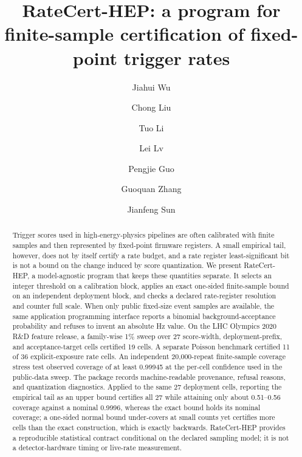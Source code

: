 \documentclass[preprint,12pt]{elsarticle}
\begin{document}
\begin{frontmatter}

\title{RateCert-HEP: a program for finite-sample certification of
fixed-point trigger rates}

\author[hebut]{Jiahui Wu}
\author[hongyang]{Chong Liu}
\author[hongyang]{Tuo Li}
\author[hongyang]{Lei Lv}
\author[hongyang]{Pengjie Guo}
\author[hongyang]{Guoquan Zhang}
\author[hebut]{Jianfeng Sun}

\address[hebut]{School of Materials Science and Engineering, Hebei University of
Technology, Tianjin 300401, China}
\address[hongyang]{Hongyang Display (Xianyang) Technology Co., Ltd.,
Xianyang 712000, Shaanxi, China}

\begin{abstract}
Trigger scores used in high-energy-physics pipelines are often calibrated with
finite samples and then represented by fixed-point firmware registers.  A small
empirical tail, however, does not by itself certify a rate budget, and a rate
register least-significant bit is not a bound on the change induced by score
quantization.  We present RateCert-HEP, a model-agnostic program that keeps
these quantities separate.  It selects an integer threshold on a calibration
block, applies an exact one-sided finite-sample bound on an independent
deployment block, and checks a declared rate-register resolution and counter
full scale.  When only public fixed-size event samples are available, the same
application programming interface reports a binomial background-acceptance
probability and refuses to invent an absolute Hz value.  On the LHC Olympics
2020 R\&D feature release, a family-wise 1\% sweep over 27 score-width,
deployment-prefix, and acceptance-target cells certified 19 cells.  A separate
Poisson benchmark certified 11 of 36 explicit-exposure rate cells.  An
independent 20{,}000-repeat finite-sample coverage stress test observed
coverage of at least 0.99945 at the per-cell confidence used in the public-data
sweep.  The package records machine-readable provenance, refusal reasons, and
quantization diagnostics.  Applied to the same 27 deployment cells, reporting
the empirical tail as an upper bound certifies all 27 while attaining only
about 0.51--0.56 coverage against a nominal 0.9996, whereas the exact bound
holds its nominal coverage; a one-sided normal bound under-covers at small
counts yet certifies more cells than the exact construction, which is exactly
backwards.  RateCert-HEP provides a reproducible statistical contract
conditional on the declared sampling model; it is not a detector-hardware
timing or live-rate measurement.


\end{abstract}
\end{frontmatter}
\end{document}
